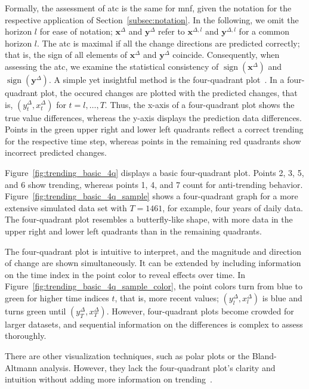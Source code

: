 \documentclass[pdflatex]{sn-jnl}
\theoremstyle{plain}%
\theoremstyle{definition}
\DeclareMathOperator{\sign}{sign}
\newcommand{\diffxl}{\mathbf{x}^{\Delta,l}}
\newcommand{\diffyl}{\mathbf{y}^{\Delta,l}}
\newcommand{\diffx}{\mathbf{x}^{\Delta}}
\newcommand{\diffy}{\mathbf{y}^{\Delta}}
\newcommand{\diffxt}[1][t]{x^{\Delta}_{#1}}
\newcommand{\diffyt}[1][t]{y^{\Delta}_{#1}}
\begin{document}
Formally, the assessment of \ac{atc} is the same for \ac{mnf}, given the notation for the respective application of Section~\ref{subsec:notation}.
In the following, we omit the horizon $l$ for ease of notation; $\diffx$ and $\diffy$ refer to $\diffxl$ and $\diffyl$ for a common horizon $l$.
The \ac{atc} is maximal if all the change directions are predicted correctly; that is, the sign of all elements of $\diffx$ and $\diffy$ coincide.
Consequently, when assessing the \ac{atc}, we examine the statistical consistency of $\sign(\diffx)$ and $\sign(\diffy)$.
A simple yet insightful method is the four-quadrant plot~\citep[see, e.g., ][]{Perrino1998,Saugel2015}.
In a four-quadrant plot, the occured changes are plotted with the predicted changes, that is, $(\diffyt, \diffxt)$ for $t = l, \dots, T$.
Thus, the x-axis of a four-quadrant plot shows the true value differences, whereas the y-axis displays the prediction data differences.
Points in the green upper right and lower left quadrants reflect a correct trending for the respective time step, whereas points in the remaining red quadrants show incorrect predicted changes.

Figure~\ref{fig:trending_basic_4q} displays a basic four-quadrant plot.
Points 2, 3, 5, and 6 show trending, whereas points 1, 4, and 7 count for anti-trending behavior.
Figure~\ref{fig:trending_basic_4q_sample} shows a four-quadrant graph for a more extensive simulated data set with $T=1461$, for example, four years of daily data.
The four-quadrant plot resembles a butterfly-like shape, with more data in the upper right and lower left quadrants than in the remaining quadrants.

The four-quadrant plot is intuitive to interpret, and the magnitude and direction of change are shown simultaneously.
It can be extended by including information on the time index in the point color to reveal effects over time.
In Figure~\ref{fig:trending_basic_4q_sample_color}, the point colors turn from blue to green for higher time indices $t$, that is, more recent values; $(\diffyt[l], \diffxt[l])$ is blue and turns green until $(\diffyt[T], \diffxt[T])$.
However, four-quadrant plots become crowded for larger datasets, and sequential information on the differences is complex to assess thoroughly.

There are other visualization techniques, such as polar plots or the Bland-Altmann analysis.
However, they lack the four-quadrant plot's clarity and intuition without adding more information on trending~\citep{Saugel2015}.
\end{document}
